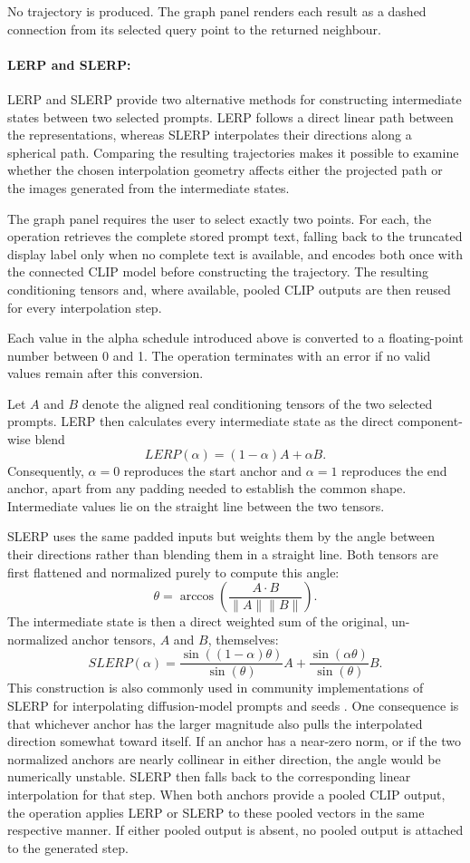 No trajectory is produced. The graph panel renders each result as a dashed connection from its selected query point to the returned neighbour.

\paragraph{LERP and SLERP:} LERP and SLERP provide two alternative methods for constructing intermediate states between two selected prompts. LERP follows a direct linear path between the representations, whereas SLERP interpolates their directions along a spherical path. Comparing the resulting trajectories makes it possible to examine whether the chosen interpolation geometry affects either the projected path or the images generated from the intermediate states.

The graph panel requires the user to select exactly two points. For each, the operation retrieves the complete stored prompt text, falling back to the truncated display label only when no complete text is available, and encodes both once with the connected CLIP model before constructing the trajectory. The resulting conditioning tensors and, where available, pooled CLIP outputs are then reused for every interpolation step.

Each value in the alpha schedule introduced above is converted to a floating-point number between 0 and 1. The operation terminates with an error if no valid values remain after this conversion.

Let $A$ and $B$ denote the aligned real conditioning tensors of the two selected prompts. LERP then calculates every intermediate state as the direct component-wise blend
\[
LERP(\alpha) = (1-\alpha)A + \alpha B.
\]
Consequently, $\alpha = 0$ reproduces the start anchor and $\alpha = 1$ reproduces the end anchor, apart from any padding needed to establish the common shape. Intermediate values lie on the straight line between the two tensors.

SLERP uses the same padded inputs but weights them by the angle between their directions rather than blending them in a straight line. Both tensors are first flattened and normalized purely to compute this angle:
\[
\theta = \arccos\left(
\frac{A \cdot B}{\lVert A \rVert \lVert B \rVert}
\right).
\]
The intermediate state is then a direct weighted sum of the original, un-normalized anchor tensors, $A$ and $B$, themselves:
\[
SLERP(\alpha) =
\frac{\sin((1-\alpha)\theta)}{\sin(\theta)}A
+
\frac{\sin(\alpha\theta)}{\sin(\theta)}B.
\]
This construction is also commonly used in community implementations of SLERP for interpolating diffusion-model prompts and seeds \cite{karpathy2022slerpgist,birchsan2025slerpgist}. One consequence is that whichever anchor has the larger magnitude also pulls the interpolated direction somewhat toward itself. If an anchor has a near-zero norm, or if the two normalized anchors are nearly collinear in either direction, the angle would be numerically unstable. SLERP then falls back to the corresponding linear interpolation for that step. When both anchors provide a pooled CLIP output, the operation applies LERP or SLERP to these pooled vectors in the same respective manner. If either pooled output is absent, no pooled output is attached to the generated step.

